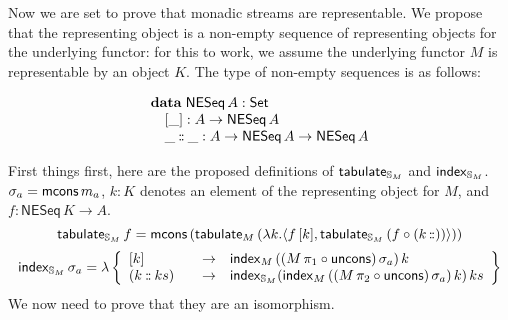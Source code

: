 \documentclass{article}
\begin{document}
Now we are set to prove that monadic streams are representable. We propose that the representing object is a non-empty sequence of representing objects for the underlying functor: for this to work, we assume the underlying functor $M$ is representable by an object $K$. The type of non-empty sequences is as follows:

$$
\begin{array}[t]{l}
\mathbf{data}\;
\mathsf{NESeq}\,A:\mathsf{Set} \\
\quad [\_]: A \rightarrow \mathsf{NESeq}\,A \\
\quad \_\mathbin{:\hspace{-0.1em}:}\_ : A \rightarrow \mathsf{NESeq}\,A \rightarrow \mathsf{NESeq}\,A
\end{array}
$$

First things first, here are the proposed definitions of $\mathsf{tabulate}_{\mathbb{S}_{M}}$ and $\mathsf{index}_{\mathbb{S}_{M}}$. $\sigma_a = \mathsf{mcons}\, m_a$, $k : K$ denotes an element of the representing object for $M$, and $f : \mathsf{NESeq}\, K \to A$.
$$
\mathsf{tabulate}_{\mathbb{S}_{M}}\, f = \mathsf{mcons}\, (\mathsf{tabulate}_M \, (\lambda k. \langle f\, [k], \mathsf{tabulate}_{\mathbb{S}_{M}}\,(f \circ (k\, \mathbin{:\hspace{-0.1em}:})) \rangle ))
$$
$$
\indexf_{\stream{M}}\, \sigma_a = \lambda \left\{
\begin{array}{l@{\qquad}l l}
[k] & \to& \indexf_M\, ((M\,\pi_1 \circ \uncons)\,\sigma_a)\, k\\
(k \cons ks) &\to& \indexf_{\stream{M}} (\indexf_M\, ((M\,\pi_2 \circ \uncons)\, \sigma_a)\, k)\, ks
\end{array}
\right\}
$$
We now need to prove that they are an isomorphism.
\end{document}
